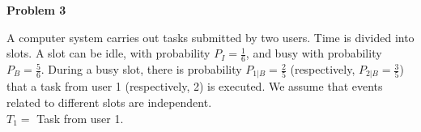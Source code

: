 \documentclass[answers]{exam}
\begin{document}
\begin{questions}
\begin{parts}
\begin{solution}
        \end{solution}
    \end{parts}

    \question \textbf{Problem 3}

    A computer system carries out tasks submitted by two users. Time is divided
    into slots. A slot can be idle, with probability $P_I = \frac{1}{6}$, and busy
    with probability $P_B = \frac{5}{6}$. During a busy slot, there is probability
    $P_{1 | B} = \frac{2}{5}$ (respectively, $P_{2 | B} = \frac{3}{5}$) that a task
    from user 1 (respectively, 2) is executed. We assume that events related to
    different slots are independent. \\ $T_1 = $ Task from user 1.

\end{questions}
\end{document}
